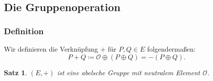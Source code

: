 \documentclass{beamer}
\theoremstyle{plain}
\newtheorem{thm}{Satz}[section]
\theoremstyle{definition}
\theoremstyle{rem}
\newcommand{\patinf}{\mathcal{O}}
\begin{document}
\subsection{Die Gruppenoperation}

\begin{frame}
    \frametitle{Definition}
    Wir definieren die Verknüpfung $+$ für $P, Q \in E$ folgendermaßen:
    \begin{equation*} \label{plus-op}
        P + Q \coloneqq \patinf \oplus (P \oplus Q) = -(P \oplus Q).
    \end{equation*}
    \pause
    \begin{thm}
        $(E, +)$ ist eine abelsche Gruppe mit neutralem Element $\patinf$.
    \end{thm}
\end{frame}

\end{document}
